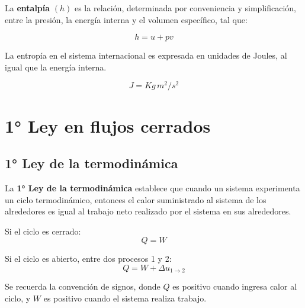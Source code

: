 \begin{defs}
    La \textbf{entalpía} $(h)$ es la relación, determinada por conveniencia y simplificación, entre la presión, la energía interna y el volumen específico, tal que:

    \begin{equation}\label{EA1-Definición de entalpía}
        h = u + pv
    \end{equation}
\end{defs}

La entropía en el sistema internacional es expresada en unidades de Joules, al igual que la energía interna.

\begin{equation}\label{EA1-entalpía Relación entre unidades}
    J = Kg \, m^2/s^2
\end{equation}

\newpage

\section{1° Ley en flujos cerrados}

\subsection{1° Ley de la termodinámica}

\begin{defs}
    La \textbf{1° Ley de la termodinámica} establece que cuando un sistema experimenta un ciclo termodinámico, entonces el calor suministrado al sistema de los alrededores es igual al trabajo neto realizado por el sistema en sus alrededores.

    Si el ciclo es cerrado:
    \begin{equation}\label{EA1-1°Ley de la termodinámica cerrado}
        Q = W
    \end{equation}

    Si el ciclo es abierto, entre dos procesos 1 y 2:
    \begin{equation}\label{EA1-1°Ley de la termodinámica abierto}
        Q = W + \Delta u_{1\rightarrow 2}
    \end{equation}

    Se recuerda la convención de signos, donde $Q$ es positivo cuando ingresa calor al ciclo, y $W$ es positivo cuando el sistema realiza trabajo.

\end{defs}

